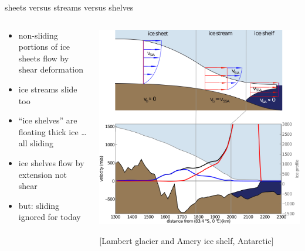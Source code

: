 \documentclass[hide notes,intlimits]{beamer}
\begin{document}
\begin{frame}{sheets versus streams versus shelves}

\begin{columns}
\begin{column}{0.35\textwidth}
\small
\begin{itemize}
\small
\item non-sliding portions of ice sheets flow by shear deformation
\item ice streams slide too
\item ``ice shelves'' are floating thick ice \dots all sliding
\item ice shelves flow by extension not shear
\item but: sliding ignored for today
\end{itemize}
\end{column}

\begin{column}{0.65\textwidth}
\includegraphics[width=\textwidth]{siassacartoon-lambert}

\begin{center}
\vspace{-0.18in}
\tiny [Lambert glacier and Amery ice shelf, Antarctic]
\end{center}
\end{column}
\end{columns}
\end{frame}
\end{document}

